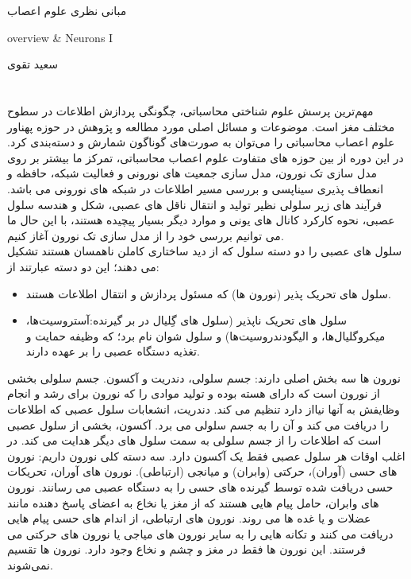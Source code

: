 \documentclass[a4paper,12pt]{article}
\begin{document}
\begin{center}
{\Huge مبانی نظری علوم اعصاب 
\\
\begin{latin}
overview \& Neurons I
\end{latin}
}
\vspace*{1cm}
سعید تقوی


\end{center}
\section*{ }
مهم‌ترین پرسش علوم شناختی محاسباتی، چگونگی پردازش اطلاعات در سطوح مختلف مغز است. موضوعات و مسائل اصلی مورد مطالعه و پژوهش در حوزه پهناور علوم اعصاب محاسباتی را می‌توان به صورت‌های گوناگون شمارش و دسته‌بندی کرد. در این دوره از بین حوزه های متفاوت علوم اعصاب محاسباتی، تمرکز ما بیشتر بر روی مدل سازی تک نورون، مدل سازی جمعیت های نورونی و فعالیت شبکه، حافظه و انعطاف پذیری سیناپسی و بررسی مسیر اطلاعات در شبکه های نورونی می باشد.
فرآیند های زیر سلولی نظیر تولید و انتقال ناقل های عصبی، شکل و هندسه سلول عصبی، نحوه کارکرد کانال های یونی و موارد دیگر بسیار پیچیده هستند، با این حال ما می توانیم بررسی خود را از مدل سازی تک نورون آغاز کنیم.  
\\
سلول های عصبی را دو دسته سلول که از دید ساختاری کاملن ناهمسان هستند تشکیل می دهند؛ این دو دسته عبارتند از:
\begin{itemize}
	\item{
	 سلول های تحریک پذیر (نورون ها) که مسئول پردازش و انتقال اطلاعات هستند.
	}
	\item {
	 سلول های تحریک ناپذیر (سلول های گِلیال در بر گیرنده:آستروسیت‌ها، میکروگلیال‌ها، و الیگودندروسیت‌ها) و سلول شوان نام برد؛ که وظیفه حمایت و تغذیه دستگاه عصبی را بر عهده دارند.
	}
\end{itemize}
نورون ها سه بخش اصلی دارند: جسم سلولی، دندریت و آکسون. جسم سلولی بخشی از نورون است که دارای هسته بوده و تولید موادی را که نورون برای رشد و انجام وظایفش به آنها نیااز دارد تنظیم می کند. دندریت، انشعابات سلول عصبی که اطلاعات را دریافت می کند و آن را به جسم سلولی می برد. آکسون، بخشی از سلول عصبی است که اطلاعات را از جسم سلولی به سمت سلول های دیگر هدایت می کند. در اغلب اوقات هر سلول عصبی فقط یک آکسون دارد. سه دسته کلی نورون داریم: نورون های حسی (آوران)، حرکتی (وابران) و میانجی (ارتباطی). نورون های آوران، تحریکات حسی دریافت شده توسط گیرنده های حسی را به دستگاه عصبی می رسانند. نورون های وابران، حامل پیام هایی هستند که از مغز یا نخاع به اعضای پاسخ دهنده مانند عضلات و یا غده ها می روند. نورون های ارتباطی، از اندام های حسی پیام هایی دریافت می کنند و تکانه هایی را به سایر نورون های میاجی یا نورون های حرکتی می فرستند. این نورون ها فقط در مغز و چشم و نخاع وجود دارد.
نورون ها تقسیم نمی‌شوند.
\end{document}

